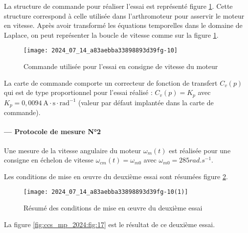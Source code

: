La structure de commande pour réaliser l'essai est représenté figure \ref{fig:ccs_mp_2024:fig:15}. Cette structure correspond à celle utilisée dans l'arthromoteur pour asservir le moteur en vitesse. Après avoir transformé les équations temporelles dans le domaine de Laplace, on peut représenter la boucle de vitesse comme sur la figure \ref{fig:ccs_mp_2024:fig:15}.

\begin{figure}[!h]\centering
\texttt{[image: 2024\_07\_14\_a83aebba33898893d39fg-10]}
\caption{\label{fig:ccs_mp_2024:fig:15}Commande utilisée pour l'essai en consigne de vitesse du moteur}
\end{figure}


La carte de commande comporte un correcteur de fonction de transfert $C_{v}(p)$ qui est de type proportionnel pour l'essai réalisé : $C_{v}(p)=K_{p}$ avec $K_{p}=0,0094 \mathrm{~A} \cdot \mathrm{s} \cdot \mathrm{rad}^{-1}$ (valeur par défaut implantée dans la carte de commande).

\paragraph*{— Protocole de mesure N°2}
Une mesure de la vitesse angulaire du moteur $\omega_{m}(t)$ est réalisée pour une consigne en échelon de vitesse $\omega_{c m}(t)=\omega_{m 0}$ avec $\omega_{m 0}=285 \si{rad.s^{-1}}$.

Les conditions de mise en œuvre du deuxième essai sont résumées figure \ref{fig:ccs_mp_2024:fig:16}.

\begin{figure}[!h]\centering
\texttt{[image: 2024\_07\_14\_a83aebba33898893d39fg-10(1)]}
\caption{\label{fig:ccs_mp_2024:fig:16}Résumé des conditions de mise en œuvre du deuxième essai}
\end{figure}
La figure \ref{fig:ccs_mp_2024:fig:17} est le résultat de ce deuxième essai.


